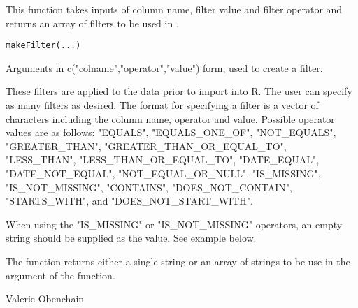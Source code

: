 \documentclass{book}
\begin{document}
\begin{Description}\relax
This function takes inputs of column name, filter value and filter operator and 
returns an array of filters to be used in .
\end{Description}
\begin{Usage}
\begin{verbatim}
makeFilter(...)
\end{verbatim}
\end{Usage}
\begin{Arguments}
\begin{ldescription}
\item[\code{...}] Arguments in c("colname","operator","value") form, used to create a filter.
\end{ldescription}
\end{Arguments}
\begin{Details}\relax
These filters are applied to the data prior to import into R. The user can specify as many 
filters as desired. The format for specifying a filter is a vector of characters including
the column name, operator and value.
Possible operator values are as follows:
"EQUALS", "EQUALS\_ONE\_OF", "NOT\_EQUALS", "GREATER\_THAN", "GREATER\_THAN\_OR\_EQUAL\_TO", 
"LESS\_THAN", "LESS\_THAN\_OR\_EQUAL\_TO", "DATE\_EQUAL", "DATE\_NOT\_EQUAL", 
"NOT\_EQUAL\_OR\_NULL", "IS\_MISSING", "IS\_NOT\_MISSING", "CONTAINS", "DOES\_NOT\_CONTAIN", 
"STARTS\_WITH", and "DOES\_NOT\_START\_WITH".

When using the "IS\_MISSING" or "IS\_NOT\_MISSING" operators, an empty string should be supplied as the value.
See example below.
\end{Details}
\begin{Value}
The function returns either a single string or an array of strings to be use in the
 argument of the  function.
\end{Value}
\begin{Author}\relax
Valerie Obenchain
\end{Author}
\end{document}
